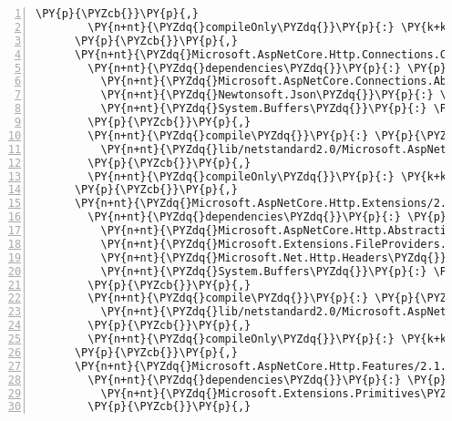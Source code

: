 \begin{Verbatim}[commandchars=\\\{\},numbers=left,firstnumber=1,stepnumber=1,numberblanklines=0]
        \PY{p}{\PYZcb{}}\PY{p}{,}
        \PY{n+nt}{\PYZdq{}compileOnly\PYZdq{}}\PY{p}{:} \PY{k+kc}{true}
      \PY{p}{\PYZcb{}}\PY{p}{,}
      \PY{n+nt}{\PYZdq{}Microsoft.AspNetCore.Http.Connections.Common/1.0.0\PYZhy{}rc1\PYZhy{}final\PYZdq{}}\PY{p}{:} \PY{p}{\PYZob{}}
        \PY{n+nt}{\PYZdq{}dependencies\PYZdq{}}\PY{p}{:} \PY{p}{\PYZob{}}
          \PY{n+nt}{\PYZdq{}Microsoft.AspNetCore.Connections.Abstractions\PYZdq{}}\PY{p}{:} \PY{l+s+s2}{\PYZdq{}2.1.0\PYZhy{}rc1\PYZhy{}final\PYZdq{}}\PY{p}{,}
          \PY{n+nt}{\PYZdq{}Newtonsoft.Json\PYZdq{}}\PY{p}{:} \PY{l+s+s2}{\PYZdq{}11.0.2\PYZdq{}}\PY{p}{,}
          \PY{n+nt}{\PYZdq{}System.Buffers\PYZdq{}}\PY{p}{:} \PY{l+s+s2}{\PYZdq{}4.5.0\PYZhy{}rc1\PYZdq{}}
        \PY{p}{\PYZcb{}}\PY{p}{,}
        \PY{n+nt}{\PYZdq{}compile\PYZdq{}}\PY{p}{:} \PY{p}{\PYZob{}}
          \PY{n+nt}{\PYZdq{}lib/netstandard2.0/Microsoft.AspNetCore.Http.Connections.Common.dll\PYZdq{}}\PY{p}{:} \PY{p}{\PYZob{}}\PY{p}{\PYZcb{}}
        \PY{p}{\PYZcb{}}\PY{p}{,}
        \PY{n+nt}{\PYZdq{}compileOnly\PYZdq{}}\PY{p}{:} \PY{k+kc}{true}
      \PY{p}{\PYZcb{}}\PY{p}{,}
      \PY{n+nt}{\PYZdq{}Microsoft.AspNetCore.Http.Extensions/2.1.0\PYZhy{}rc1\PYZhy{}final\PYZdq{}}\PY{p}{:} \PY{p}{\PYZob{}}
        \PY{n+nt}{\PYZdq{}dependencies\PYZdq{}}\PY{p}{:} \PY{p}{\PYZob{}}
          \PY{n+nt}{\PYZdq{}Microsoft.AspNetCore.Http.Abstractions\PYZdq{}}\PY{p}{:} \PY{l+s+s2}{\PYZdq{}2.1.0\PYZhy{}rc1\PYZhy{}final\PYZdq{}}\PY{p}{,}
          \PY{n+nt}{\PYZdq{}Microsoft.Extensions.FileProviders.Abstractions\PYZdq{}}\PY{p}{:} \PY{l+s+s2}{\PYZdq{}2.1.0\PYZhy{}rc1\PYZhy{}final\PYZdq{}}\PY{p}{,}
          \PY{n+nt}{\PYZdq{}Microsoft.Net.Http.Headers\PYZdq{}}\PY{p}{:} \PY{l+s+s2}{\PYZdq{}2.1.0\PYZhy{}rc1\PYZhy{}final\PYZdq{}}\PY{p}{,}
          \PY{n+nt}{\PYZdq{}System.Buffers\PYZdq{}}\PY{p}{:} \PY{l+s+s2}{\PYZdq{}4.5.0\PYZhy{}rc1\PYZdq{}}
        \PY{p}{\PYZcb{}}\PY{p}{,}
        \PY{n+nt}{\PYZdq{}compile\PYZdq{}}\PY{p}{:} \PY{p}{\PYZob{}}
          \PY{n+nt}{\PYZdq{}lib/netstandard2.0/Microsoft.AspNetCore.Http.Extensions.dll\PYZdq{}}\PY{p}{:} \PY{p}{\PYZob{}}\PY{p}{\PYZcb{}}
        \PY{p}{\PYZcb{}}\PY{p}{,}
        \PY{n+nt}{\PYZdq{}compileOnly\PYZdq{}}\PY{p}{:} \PY{k+kc}{true}
      \PY{p}{\PYZcb{}}\PY{p}{,}
      \PY{n+nt}{\PYZdq{}Microsoft.AspNetCore.Http.Features/2.1.0\PYZhy{}rc1\PYZhy{}final\PYZdq{}}\PY{p}{:} \PY{p}{\PYZob{}}
        \PY{n+nt}{\PYZdq{}dependencies\PYZdq{}}\PY{p}{:} \PY{p}{\PYZob{}}
          \PY{n+nt}{\PYZdq{}Microsoft.Extensions.Primitives\PYZdq{}}\PY{p}{:} \PY{l+s+s2}{\PYZdq{}2.1.0\PYZhy{}rc1\PYZhy{}final\PYZdq{}}
        \PY{p}{\PYZcb{}}\PY{p}{,}

\end{Verbatim}
